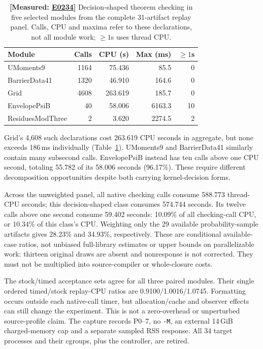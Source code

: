 \documentclass[10pt,twocolumn]{article}
\newcommand{\measured}[1]{\textbf{[Measured: #1]}}
\newcommand{\expref}[2]{\href{https://github.com/yunwei37/proofserve/blob/main/docs/tmp/build-and-evaluate/step-#1/step-report.md}{E#2}}
\begin{document}
\begin{table}[t]
\centering\small\setlength{\tabcolsep}{3pt}
\begin{tabular}{lrrrr}
\toprule
Module & Calls & CPU (s) & Max (ms) & $\geq1$s\\
\midrule
UMoments9 &1164&75.436&85.5&0\\
BarrierData41 &1320&46.910&164.6&0\\
Grid &4608&263.619&185.7&0\\
EnvelopePsiB &40&58.006&6163.3&10\\
ResiduesModThree &2&3.620&2274.5&2\\
\bottomrule
\end{tabular}
\caption{\measured{\expref{0234-20261101T030854+0000}{0234}} Decision-shaped theorem checking in five selected modules from
the complete 31-artifact replay panel. Calls, CPU and maxima refer to these
declarations, not all module work; $\geq1$s uses thread CPU.}
\label{tab:grain}
\end{table}

Grid's 4,608 such declarations cost 263.619 CPU seconds in aggregate,
but none exceeds 186\,ms individually (Table~\ref{tab:grain}).
UMoments9 and BarrierData41 similarly contain many subsecond calls.
EnvelopePsiB instead has ten calls above one CPU second, totaling
55.782 of its 58.006 seconds (96.17\%).
These require different decomposition opportunities despite both carrying
kernel-decision forms.

Across the unweighted panel, all native checking calls consume 588.773
thread-CPU seconds; this decision-shaped class consumes 574.744 seconds.
Its twelve calls above one second consume 59.402 seconds:
10.09\% of all checking-call CPU, or 10.34\% of this class's CPU.
Weighting only the 29 available probability-sample artifacts gives
28.23\% and 34.93\%, respectively.
These are conditional available-case ratios, not unbiased full-library
estimates or upper bounds on parallelizable work: thirteen original draws
are absent and nonresponse is not corrected.
They must not be multiplied into source-compiler or whole-closure costs.

The stock/timed acceptance sets agree for all three paired modules.
Their single ordered timed/stock replay-CPU ratios are
0.9100/1.0016/1.0745. Formatting occurs outside each native-call timer,
but allocation/cache and observer effects can still change the experiment.
This is not a zero-overhead or unperturbed source-profile claim.
The capture records P0--7, no \texttt{-M}, an external 14\,GiB charged-memory
cap and a separate sampled RSS response.
All 34 target processes and their cgroups, plus the controller, are retired.
\end{document}
